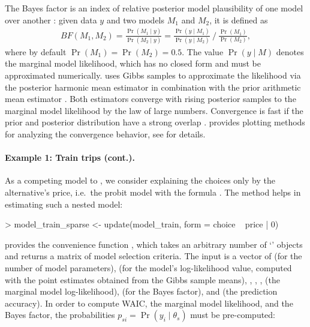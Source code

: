 \documentclass[article,shortnames]{jss}
\newcommand{\class}[1]{`\code{#1}'}
\newcommand{\fct}[1]{\code{#1()}}
\begin{document}
The Bayes factor is an index of relative posterior model plausibility of one model over another \citep{Marin:2014}: given data $y$ and two models $M_1$ and $M_2$, it is defined as
\begin{align*}
BF(M_1,M_2) = \frac{\Pr(M_1 \mid y)}{\Pr(M_2 \mid y)} = \frac{\Pr(y \mid M_1 )}{\Pr(y \mid M_2)}~/~\frac{\Pr(M_1)}{\Pr(M_2)},
\end{align*}
where by default $\Pr(M_1) = \Pr(M_2) = 0.5$. The value $\Pr(y \mid M)$ denotes the marginal model likelihood, which has no closed form and must be approximated numerically.  uses Gibbs samples to approximate the likelihood via the posterior harmonic mean estimator \citep{Newton:1994} in combination with the prior arithmetic mean estimator \citep{Hammersley:1964}. Both estimators converge with rising posterior samples to the marginal model likelihood by the law of large numbers. Convergence is fast if the prior and posterior distribution have a strong overlap \citep{Gronau:2017}.  provides plotting methods for analyzing the convergence behavior, see  for details.

\paragraph{Example 1: Train trips (cont.).}

As a competing model to , we consider explaining the choices only by the alternative's price, i.e.\ the probit model with the formula . The \fct{update} method helps in estimating such a nested model:

\begin{Schunk}
\begin{Sinput}
> model_train_sparse <- update(model_train, form = choice ~ price | 0)
\end{Sinput}
\end{Schunk}

 provides the convenience function \fct{model\_selection}, which takes an arbitrary number of \class{RprobitB\_fit} objects and returns a matrix of model selection criteria. The  input is a vector of  (for the number of model parameters),  (for the model's log-likelihood value, computed with the point estimates obtained from the Gibbs sample means), , , ,  (the marginal model log-likelihood),  (for the Bayes factor), and  (the prediction accuracy). In order to compute WAIC, the marginal model likelihood, and the Bayes factor, the probabilities $p_{si} = \Pr(y_i\mid \theta_s)$ must be pre-computed:
\end{document}
